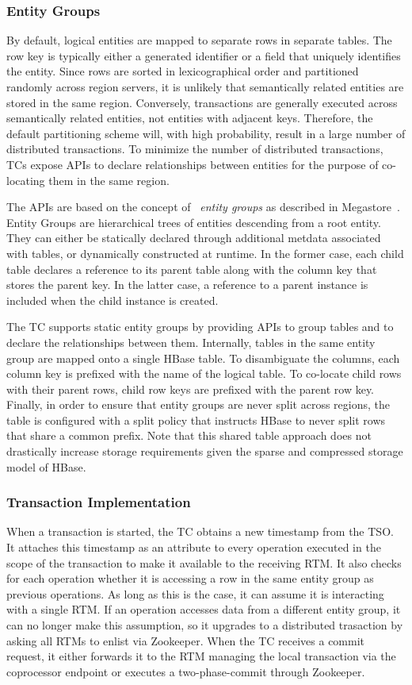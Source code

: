 \documentclass[10pt,final,journal]{IEEEtran}
\begin{document}
\subsubsection{Entity Groups}
By default, logical entities are mapped to separate rows in separate tables. The row key is typically either a generated identifier or a field that uniquely identifies the entity. Since rows are sorted in lexicographical order and partitioned randomly across region servers, it is unlikely that semantically related entities are stored in the same region. Conversely, transactions are generally executed across semantically related entities, not entities with adjacent keys. Therefore, the default partitioning scheme will, with high probability, result in a large number of distributed transactions. To minimize the number of distributed transactions, TCs expose APIs to declare relationships between entities for the purpose of co-locating them in the same region.

The APIs are based on the concept of ~\emph{entity groups} as described in Megastore~\cite{Baker:2011:8530095}. Entity Groups are hierarchical trees of entities descending from a root entity. They can either be statically declared through additional metdata associated with tables, or dynamically constructed at runtime. In the former case, each child table declares a reference to its parent table along with the column key that stores the parent key. In the latter case, a reference to a parent instance is included when the child instance is created.

The TC supports static entity groups by providing APIs to group tables and to declare the relationships between them. Internally, tables in the same entity group are mapped onto a single HBase table. To disambiguate the columns, each column key is prefixed with the name of the logical table. To co-locate child rows with their parent rows, child row keys are prefixed with the parent row key. Finally, in order to ensure that entity groups are never split across regions, the table is configured with a split policy that instructs HBase to never split rows that share a common prefix. Note that this shared table approach does not drastically increase storage requirements given the sparse and compressed storage model of HBase.

\subsubsection{Transaction Implementation}
When a transaction is started, the TC obtains a new timestamp from the TSO. It attaches this timestamp as an attribute to every operation executed in the scope of the transaction to make it available to the receiving RTM. It also checks for each operation whether it is accessing a row in the same entity group as previous operations. As long as this is the case, it can assume it is interacting with a single RTM. If an operation accesses data from a different entity group, it can no longer make this assumption, so it upgrades to a distributed trasaction by asking all RTMs to enlist via Zookeeper. When the TC receives a commit request, it either forwards it to the RTM managing the local transaction via the coprocessor endpoint or executes a two-phase-commit through Zookeeper.
\end{document}
